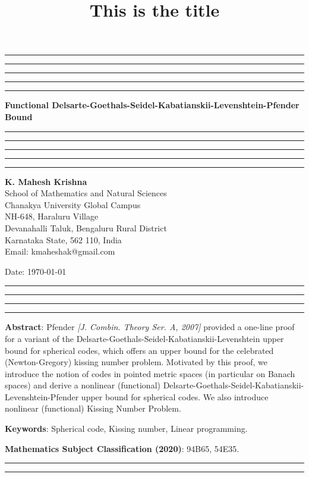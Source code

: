 \documentclass{amsart}
\title{This is the title}
\begin{document}
\hrule\hrule\hrule\hrule\hrule
\vspace{0.3cm}	
\begin{center}
{\bf{Functional Delsarte-Goethals-Seidel-Kabatianskii-Levenshtein-Pfender Bound}}\\
\vspace{0.3cm}
\hrule\hrule\hrule\hrule\hrule
\vspace{0.3cm}
\textbf{K. Mahesh Krishna}\\
School of Mathematics and Natural Sciences\\
Chanakya University Global Campus\\
NH-648, Haraluru Village\\
Devanahalli Taluk, 	Bengaluru  Rural District\\
Karnataka State, 562 110, India\\
 Email: kmaheshak@gmail.com

Date: \today
\end{center}

\hrule\hrule
\hrule\hrule 
\vspace{0.5cm}
\textbf{Abstract}: Pfender \textit{[J. Combin. Theory Ser. A, 2007]} provided a one-line proof for a variant of the Delsarte-Goethals-Seidel-Kabatianskii-Levenshtein upper bound for spherical codes, which offers an upper bound for the celebrated (Newton-Gregory) kissing number problem. Motivated by this proof, we introduce the notion of codes in pointed metric spaces (in particular on Banach spaces) and derive a nonlinear (functional) Delsarte-Goethals-Seidel-Kabatianskii-Levenshtein-Pfender upper bound for spherical codes. We also introduce nonlinear (functional) Kissing Number Problem.


\textbf{Keywords}:  Spherical code, Kissing number, Linear programming.

\textbf{Mathematics Subject Classification (2020)}: 94B65, 54E35.\\

\hrule


\hrule
\end{document}
